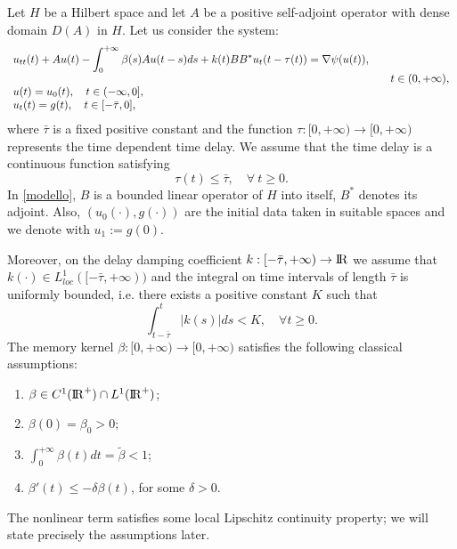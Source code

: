 \documentclass[11pt]{article}
\newcommand{\RR}{{{\rm I} \kern -.15em {\rm R} }}
\renewcommand{\geq}{\geqslant}
\renewcommand{\ge}{\geqslant}
\renewcommand{\leq}{\leqslant}
\renewcommand{\le}{\leqslant}
\begin{document}
Let $H$ be a Hilbert space and let $A$ be a positive self-adjoint operator with dense domain $D(A)$ in $H.$ Let us consider the system:
\begin{equation}
\label{modello}
\begin{array}{l}
\displaystyle{u_{tt}(t)+Au(t)- \int_0^{+\infty} \beta (s)Au(t-s) ds+k(t)BB^*u_t(t-\tau (t))=\nabla \psi( u(t)), }\\
\hspace{12 cm}\ t\in (0,+\infty),\\
\displaystyle{
 u(t)=u_0(t), \quad t\in (-\infty, 0],}\\
\displaystyle{ u_t(t)=g(t), \quad t\in [-\bar\tau,0],}
\end{array}
\end{equation}
where $\bar\tau$ is a fixed positive constant and the function $\tau: [0,+\infty)\rightarrow [0,+\infty)$ represents the time dependent time delay. We assume that the time delay is a continuous function satisfying
\begin{equation}\label{tau_bounded}
\tau(t)\le \bar\tau,\quad  \forall \ t\ge 0.
\end{equation}
In \eqref{modello}, $B$ is a bounded linear operator of $H$ into itself, $B^*$ denotes its adjoint. Also, $(u_0(\cdot), g(\cdot))$ are the initial data taken in suitable spaces and we denote with $u_1:=g(0)$.

Moreover, on the delay damping coefficient  $k:[-\bar\tau,+\infty)\rightarrow \RR$ we assume that   $k(\cdot)\in L^1_{loc} ([-\bar\tau,+\infty))$ and the integral on time intervals of length $\bar\tau$ is uniformly bounded, i.e. there exists a positive constant $K$ such that 
\begin{equation}\label{K}
\int_{t-\bar\tau}^t |k(s)| ds < K, \quad \forall t\geq 0.
\end{equation}
The memory kernel $\beta:[0,+\infty) \rightarrow [0,+\infty)$ satisfies the following classical  assumptions:
\begin{enumerate}[label=(\roman*)]
\item $\beta \in C^1(\RR^+) \cap L^1(\RR^+)$;
\item $\beta(0)=\beta_{0}>0$;
\item $\int_0^{+\infty} \beta(t)dt=\tilde{\beta}<1$;
\item $\beta'(t)\leq -\delta \beta(t)$, for some $\delta>0$.
\end{enumerate}
The nonlinear term satisfies some local Lipschitz continuity property; we will state precisely the assumptions later. 
\end{document}
